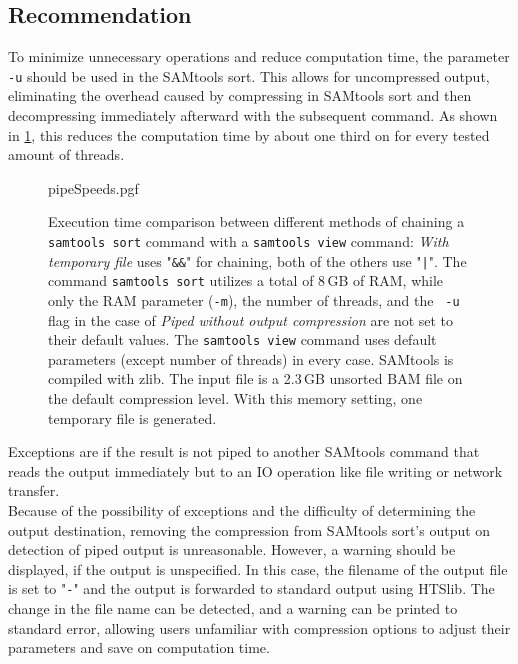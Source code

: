 \subsection{Recommendation}
To minimize unnecessary operations and reduce computation time, the parameter \texttt{-u} should be used in the SAMtools sort. This allows for uncompressed output, eliminating the overhead caused by compressing in SAMtools sort and then decompressing immediately afterward with the subsequent command. As shown in \ref{fig:pipeSpeeds}, this reduces the computation time by about one third on for every tested amount of threads.\\
\begin{figure}[t]
        {pipeSpeeds.pgf}
    \caption{Execution time comparison between different methods of chaining a \texttt{samtools sort} command with a \texttt{samtools view} command: \textit{With temporary file} uses "\texttt{\&\&}" for chaining, both of the others use "\texttt{|}". The command \texttt{samtools sort} utilizes a total of 8\,GB of RAM, while only the RAM parameter (\texttt{-m}), the number of threads, and the \texttt{ -u} flag in the case of \textit{Piped without output compression} are not set to their default values.
    The \texttt{samtools view} command uses default parameters (except number of threads) in every case. SAMtools is compiled with zlib. The input file is a 2.3\,GB unsorted BAM file on the default compression level. With this memory setting, one temporary file is generated.
    }
    \label{fig:pipeSpeeds}
\end{figure}
Exceptions are if the result is not piped to another SAMtools command that reads the output immediately but to an IO operation like  file writing or network transfer. \\
Because of the possibility of exceptions and the difficulty of determining the output destination, removing the compression from SAMtools sort's output on detection of piped output is unreasonable. However, a warning should be displayed, if the output is unspecified. In this case, the filename of the output file is set to "\texttt{-}" and the output is forwarded to standard output using HTSlib. The change in the file name can be detected, and a warning can be printed to standard error, allowing users unfamiliar with compression options to adjust their parameters and save on computation time.


